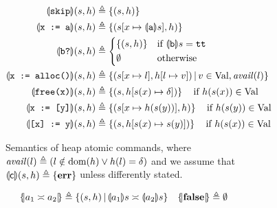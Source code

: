 \begin{figure}[t]
	\begin{subfigure}[t]{\linewidth}
		\centering
		\begin{align*}
			\edenot{\code{skip}} (s, h)         & \eqdef \{ (s, h) \}                                                                                    \\
			\edenot{\code{x := a}} (s, h)       & \eqdef \left\lbrace (s[x \mapsto \edenot{\code{a}} s], h) \right\rbrace                                \\
			\edenot{\code{b?}} (s, h)           & \eqdef \begin{cases*}
				                                             \left\lbrace (s, h) \right\rbrace & if $\edenot{\code{b}} s = \code{tt}$ \\
				                                             \emptyset                         & otherwise
			                                             \end{cases*}    \\
			\edenot{\code{x := alloc()}} (s, h) & \eqdef \left\lbrace (s[x \mapsto l], h[l \mapsto v]) \svert v \in \Val, \mathit{avail}(l)\right\rbrace \\
			\edenot{\code{free(x)}} (s, h)      & \eqdef
			\left\lbrace (s, h[s(x) \mapsto \delta]) \right\rbrace\quad \text{if}~h(s(x)) \in \Val                                                       \\
			\edenot{\code{x := [y]}} (s, h)     & \eqdef
			\left\lbrace (s[x \mapsto h(s(y))], h) \right\rbrace\quad \text{if}~h(s(y)) \in \Val                                                         \\
			\edenot{\code{[x] := y}} (s, h)     & \eqdef
			\left\lbrace (s, h[s(x) \mapsto s(y)]) \right\rbrace \quad \text{if}~h(s(x)) \in \Val
		\end{align*}
		\caption{Semantics of heap atomic commands, where $\mathit{avail}(l) \triangleq (l \notin \text{dom}(h) \lor h(l) = \delta)$ and we assume that $\llparenthesis\mathsf{c}\rrparenthesis (s, h)\triangleq \left\lbrace \textbf{err} \right\rbrace$ unless differently stated.}
		\label{fig:sil:ssil-model-commands}
	\end{subfigure}
	\begin{subfigure}[t]{\linewidth}
		\vspace*{1ex}
		\centering
		\begin{align*}
			 & \asldenot{a_1 \asymp a_2} \eqdef \{ (s, h) \svert \edenot{a_1} s \asymp \edenot{a_2} s \}                                          &  & \asldenot{\false} \eqdef \emptyset                         \\

\end{align*}
\end{subfigure}
\end{figure}
